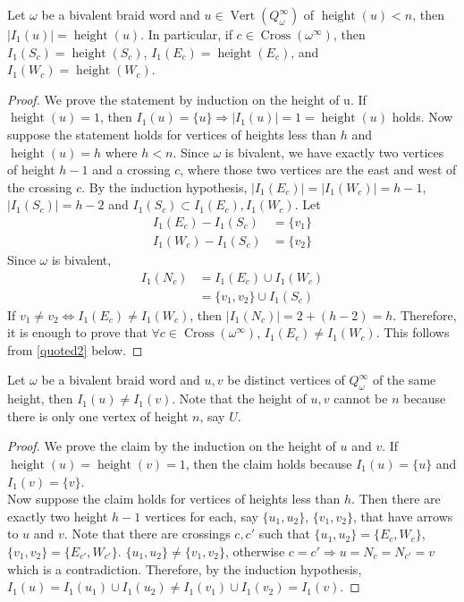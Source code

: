 \begin{lemma}\label{quoted4}
Let $\omega$ be a bivalent braid word and $u\in \operatorname{Vert}(Q_\omega^\infty)$ of $\operatorname{height}(u)<n$, then $|I_1(u)|=\operatorname{height}(u)$. In particular, if $c\in \operatorname{Cross}(\omega^\infty)$, then $I_1(S_c)=\operatorname{height}(S_c)$, $I_1(E_c)=\operatorname{height}(E_c)$, and $I_1(W_c)=\operatorname{height}(W_c)$.
\end{lemma}
\begin{proof}
We prove the statement by induction on the height of u. If $\operatorname{height}(u) = 1$, then $I_1(u) = \{u \} \Rightarrow |I_1(u)| = 1 = \operatorname{height}(u)$ holds. Now suppose the statement holds for vertices of heights less than $h$ and $\operatorname{height}(u) =h$ where $h<n$. Since $\omega$ is bivalent, we have exactly two vertices of height $h-1$ and a crossing $c$, where those two vertices are the east and west of the crossing $c$. By the induction hypothesis, $|I_1(E_c)| = |I_1(W_c)| = h-1$, $|I_1(S_c)| = h-2$ and $I_1(S_c)\subset I_1(E_c),I_1(W_c)$. Let
\begin{align*}
	I_1(E_c) - I_1(S_c) &= \{v_1\} \\
	I_1(W_c) - I_1(S_c) &= \{v_2\}
\end{align*}
Since $\omega$ is bivalent, 
\begin{align*}
	I_1(N_c) &= I_1(E_c) \cup I_1(W_c) \\
			 &= \{v_1, v_2\} \cup I_1(S_c)
\end{align*}
If $v_1 \neq v_2\Leftrightarrow I_1(E_c) \neq I_1(W_c)$, then $|I_1(N_c)| = 2 + (h-2) = h$. Therefore, it is enough to prove that $\forall c\in \operatorname{Cross}(\omega^\infty)$, $I_1(E_c) \neq I_1(W_c)$. This follows from \ref{quoted2} below.
\end{proof}

\begin{lemma}\label{quoted2}
Let $\omega$ be a bivalent braid word and $u,v$ be distinct vertices of $Q_\omega^\infty$ of the same height, then $I_1(u) \neq I_1(v)$. Note that the height of $u,v$ cannot be $n$ because there is only one vertex of height $n$, say $U$.
\end{lemma}
\begin{proof}
We prove the claim by the induction on the height of $u$ and $v$. If $\operatorname{height}(u) = \operatorname{height}(v) = 1$, then the claim holds because $I_1(u) = \{u\}$ and $I_1(v) = \{v\}$. \\
Now suppose the claim holds for vertices of heights less than $h$. Then there are exactly two height $h-1$ vertices for each, say $\{u_1,u_2\}$, $\{v_1,v_2\}$, that have arrows to $u$ and $v$. Note that there are crossings $c,c'$ such that $\{u_1,u_2\}=\{E_c,W_c\}$, $\{v_1,v_2\}=\{E_{c'},W_{c'}\}$. $\{u_1,u_2\}\neq\{v_1,v_2\}$, otherwise $c=c'\Rightarrow u=N_c=N_{c'}=v$ which is a contradiction. Therefore, by the induction hypothesis, $I_1(u) = I_1(u_1)\cup I_1(u_2)\neq I_1(v_1)\cup I_1(v_2) = I_1(v)$.
\end{proof}

